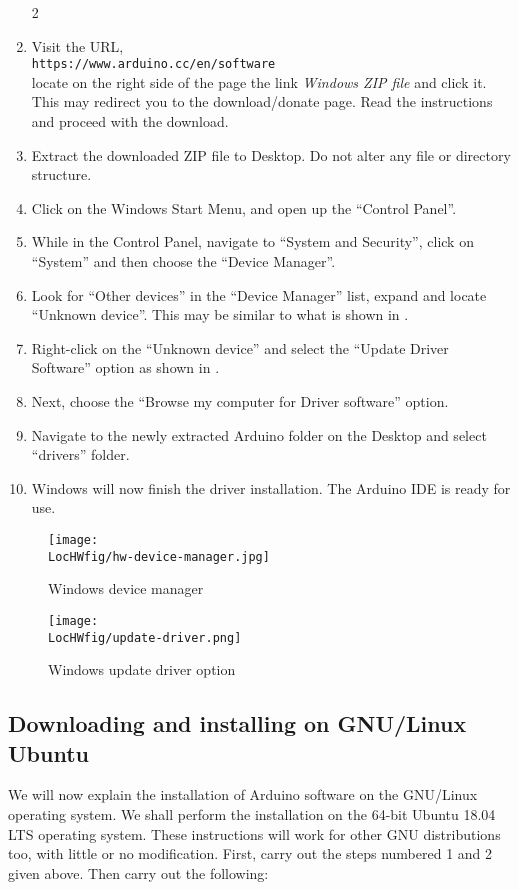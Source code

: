 \begin{enumerate}
      \setcounter{enumi}2
      \item Visit the URL, \\{\tt https://www.arduino.cc/en/software} \\
            locate on the right side of the page the link \emph{Windows ZIP file} and click it.  
            This may redirect you to the download/donate page. Read the instructions and proceed with the
            download.
      \item Extract the downloaded ZIP file to Desktop. Do not alter any
            file or directory structure.
      \item Click on the Windows Start Menu, and open up the ``Control
            Panel''.
      \item While in the Control Panel, navigate to ``System and Security'',
            click on ``System'' and then choose the ``Device Manager''.
      \item Look for ``Other devices'' in the ``Device Manager'' list,
            expand and locate ``Unknown device''.  This may be similar to what
            is shown in .
      \item Right-click on the ``Unknown device'' and select the ``Update
            Driver Software'' option as shown in .
      \item Next, choose the ``Browse my computer for Driver software''
            option.
      \item Navigate to the newly extracted Arduino folder on the Desktop and
            select ``drivers'' folder.
      \item Windows will now finish the driver installation. The Arduino IDE
            is ready for use.
\end{enumerate}

\begin{figure}
      \centering
      \texttt{[image: \\LocHWfig/hw-device-manager.jpg]}
      \caption{Windows device manager}
      \label{win-device-manager}
\end{figure}

\begin{figure}
      \centering
      \texttt{[image: \\LocHWfig/update-driver.png]}
      \caption{Windows update driver option}
      \label{win-dri-update}
\end{figure}


\subsection{Downloading and installing on GNU/Linux Ubuntu}
We will now explain the installation of Arduino software on the
GNU/Linux operating system. We shall perform the installation on the 64-bit 
Ubuntu 18.04 LTS operating system.  These
instructions will work for other GNU distributions too, with little or
no modification.  First, carry out the steps numbered 1 and 2 given
above.  Then carry out the following:

